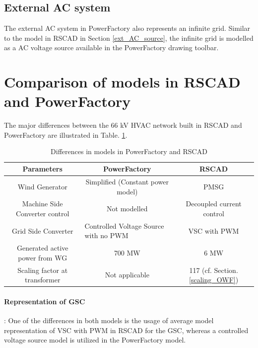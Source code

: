 \subsection{External AC system}
The external \gls{AC} system in PowerFactory also represents an infinite grid. Similar to the model in RSCAD in Section \ref{ext_AC_source}, the infinite grid is modelled as a \gls{AC} voltage source available in the PowerFactory drawing toolbar. 

\section{Comparison of models in RSCAD and PowerFactory }
The major differences between the 66 kV \gls{HVAC} network built in RSCAD and PowerFactory are illustrated in Table. \ref{tab:Comp_RSCAD_PFD_Para}. 
\vspace{-1mm}
\begingroup
\renewcommand{\arraystretch}{1.2} %
\begin{table}[H]
\centering
\begin{tabular}{|c|c|c|}
\hline
\textbf{Parameters}            & \textbf{PowerFactory} & \textbf{RSCAD}            \\ \hline
Wind Generator         & Simplified (Constant power model)          & PMSG                      \\ \hline
Machine Side Converter control        & Not modelled          & Decoupled current control \\ \hline
Grid Side Converter & \multicolumn{1}{l|}{Controlled Voltage Source with no PWM} & {VSC with PWM} \\ \hline
Generated active power from WG & 700 MW                & 6 MW                      \\ \hline
Scaling factor at transformer  & Not applicable        & 117 (cf. Section. \ref{scaling_OWF})                      \\ \hline
\end{tabular}
\caption{Differences in models in PowerFactory and RSCAD}
\label{tab:Comp_RSCAD_PFD_Para}
\end{table}
\endgroup

\vspace{-6mm}
\paragraph{Representation of \gls{GSC}}: One of the differences in both models is the usage of average model representation of \gls{VSC} with \gls{PWM} in RSCAD for the \gls{GSC}, whereas a controlled voltage source model is utilized in the PowerFactory model.
\vspace{-3mm}
